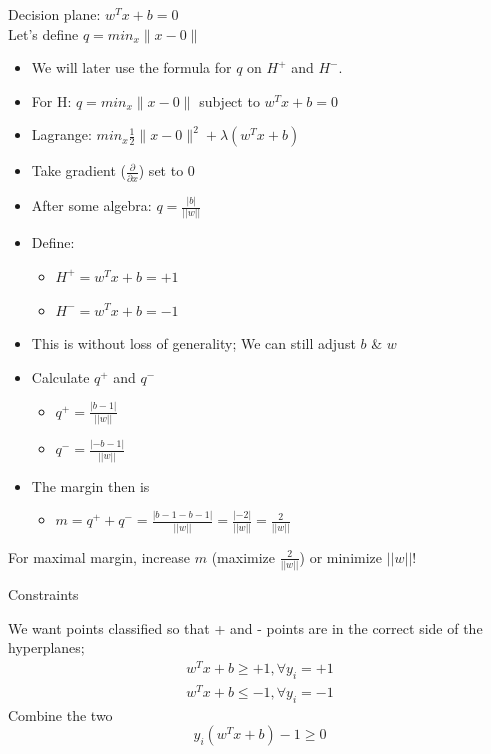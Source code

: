 \documentclass[12pt,fleqn]{article}\usepackage{../common}
\begin{document}
Decision plane: $w^{T}x + b=0$ \\
Let's define $q = min_{x}\big\|x - 0\big\|$

\begin{itemize}
   \item We will later use the formula for $q$ on $H^{+}$ and $H^{-}$.
   \item For H: $q = min_{x}\big\|x - 0\big\|$ subject to $w^{T}x+b=0$
   \item Lagrange: $min_{x}\frac{1}{2}\big\|x - 0\big\|^2+\lambda(w^{T}x+b)$
   \item Take gradient ($\frac{\partial}{\partial x}$) set to 0
   \item After some algebra: $q = \frac{|b|}{||w||}$
\end{itemize}


\begin{itemize}
  \item Define:
  \begin{itemize}  
  \item $H^{+} = w^{T}x + b=+1$
  \item $H^{-} = w^{T}x + b=-1$
  \end{itemize}
  \item This is without loss of generality; We can still adjust $b$ \& $w$
\end{itemize}

\begin{itemize}
  \item Calculate $q^{+}$ and $q^{-}$
  \begin{itemize}
  \item $q^{+} = \frac{|b-1|}{||w||}$
  \item $q^{-} = \frac{|-b-1|}{||w||}$
  \end{itemize}
  \item The margin then is 
  \begin{itemize}
  \item $m=q^{+}+q^{-} = \frac{|b-1-b-1|}{||w||} = \frac{|-2|}{||w||} = \frac{2}{||w||}$
  \end{itemize}  
\end{itemize}

For maximal margin, increase $m$ (maximize $\frac{2}{||w||}$) or minimize
$||w||$!

Constraints

We want points classified so that + and - points are in the correct side of the
hyperplanes;
\begin{eqnarray*}
w^{T}x+b \geq +1, \forall y_{i}=+1  \nonumber \\
w^{T}x+b \leq -1, \forall y_{i}=-1 \nonumber
\end{eqnarray*}
Combine the two
\begin{equation}
y_{i}(w^{T}x+b)-1 \geq 0 \nonumber
\end{equation}
\end{document}
